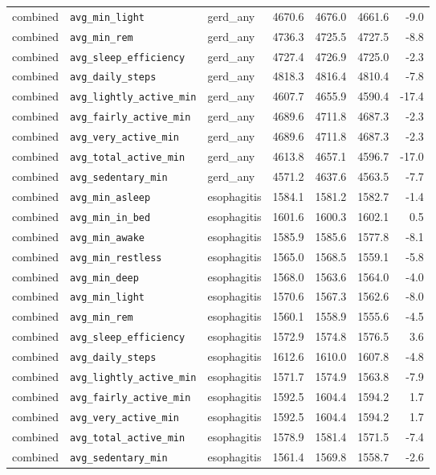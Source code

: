 \documentclass[11pt]{article}
\newcommand{\code}[1]{\texttt{\small #1}}
\begin{document}
\begin{longtable}{@{}p{1.6cm}p{3.2cm}p{2.0cm}rrrr@{}}
combined & \code{avg\_min\_light} & gerd\_any & 4670.6 & 4676.0 & 4661.6 & -9.0 \\
combined & \code{avg\_min\_rem} & gerd\_any & 4736.3 & 4725.5 & 4727.5 & -8.8 \\
combined & \code{avg\_sleep\_efficiency} & gerd\_any & 4727.4 & 4726.9 & 4725.0 & -2.3 \\
combined & \code{avg\_daily\_steps} & gerd\_any & 4818.3 & 4816.4 & 4810.4 & -7.8 \\
combined & \code{avg\_lightly\_active\_min} & gerd\_any & 4607.7 & 4655.9 & 4590.4 & -17.4 \\
combined & \code{avg\_fairly\_active\_min} & gerd\_any & 4689.6 & 4711.8 & 4687.3 & -2.3 \\
combined & \code{avg\_very\_active\_min} & gerd\_any & 4689.6 & 4711.8 & 4687.3 & -2.3 \\
combined & \code{avg\_total\_active\_min} & gerd\_any & 4613.8 & 4657.1 & 4596.7 & -17.0 \\
combined & \code{avg\_sedentary\_min} & gerd\_any & 4571.2 & 4637.6 & 4563.5 & -7.7 \\
combined & \code{avg\_min\_asleep} & esophagitis & 1584.1 & 1581.2 & 1582.7 & -1.4 \\
combined & \code{avg\_min\_in\_bed} & esophagitis & 1601.6 & 1600.3 & 1602.1 & 0.5 \\
combined & \code{avg\_min\_awake} & esophagitis & 1585.9 & 1585.6 & 1577.8 & -8.1 \\
combined & \code{avg\_min\_restless} & esophagitis & 1565.0 & 1568.5 & 1559.1 & -5.8 \\
combined & \code{avg\_min\_deep} & esophagitis & 1568.0 & 1563.6 & 1564.0 & -4.0 \\
combined & \code{avg\_min\_light} & esophagitis & 1570.6 & 1567.3 & 1562.6 & -8.0 \\
combined & \code{avg\_min\_rem} & esophagitis & 1560.1 & 1558.9 & 1555.6 & -4.5 \\
combined & \code{avg\_sleep\_efficiency} & esophagitis & 1572.9 & 1574.8 & 1576.5 & 3.6 \\
combined & \code{avg\_daily\_steps} & esophagitis & 1612.6 & 1610.0 & 1607.8 & -4.8 \\
combined & \code{avg\_lightly\_active\_min} & esophagitis & 1571.7 & 1574.9 & 1563.8 & -7.9 \\
combined & \code{avg\_fairly\_active\_min} & esophagitis & 1592.5 & 1604.4 & 1594.2 & 1.7 \\
combined & \code{avg\_very\_active\_min} & esophagitis & 1592.5 & 1604.4 & 1594.2 & 1.7 \\
combined & \code{avg\_total\_active\_min} & esophagitis & 1578.9 & 1581.4 & 1571.5 & -7.4 \\
combined & \code{avg\_sedentary\_min} & esophagitis & 1561.4 & 1569.8 & 1558.7 & -2.6 \\
\bottomrule \end{longtable}\normalsize
\end{document}
